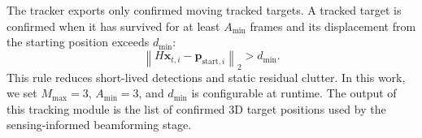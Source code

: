 The tracker exports only confirmed moving tracked targets.
A tracked target is confirmed when it has survived for at least $A_{\min}$ frames and its displacement from the starting position exceeds $d_{\min}$:
\begin{equation}
    \left\|
    H\mathbf{x}_{t,i} - \mathbf{p}_{\mathrm{start},i}
    \right\|_2
    >
    d_{\min}.
\end{equation}
This rule reduces short-lived detections and static residual clutter.
In this work, we set  $M_{\max}=3$, $A_{\min}=3$, and $d_{\min}$ is configurable at runtime.
The output of this tracking module is the list of confirmed 3D target positions used by the sensing-informed beamforming stage.